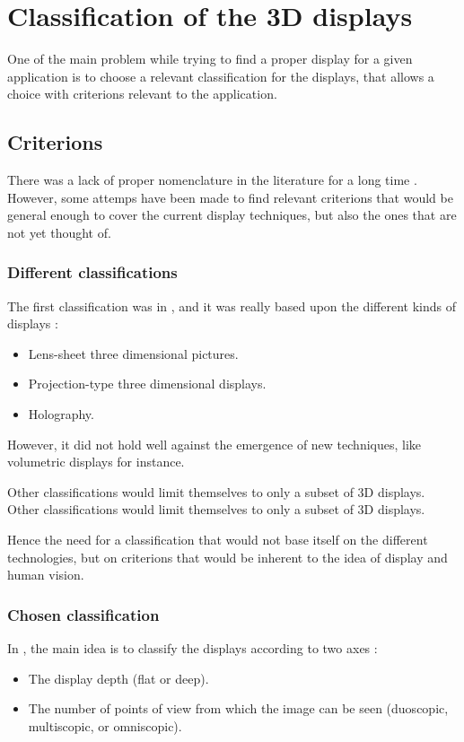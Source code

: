 \section{Classification of the 3D displays}
One of the main problem while trying to find a proper \gls{display} for a given application is to choose a relevant classification for the displays, that allows a choice with criterions relevant to the application.
\subsection{Criterions}
There was a lack of proper nomenclature in the literature for a long time \cite{pimenta2012comprehensive}. However, some attemps have been made to find relevant criterions that would be general enough to cover the current display techniques, but also the ones that are not yet thought of.

\subsubsection{Different classifications}
The first classification was in \cite{okoshi1976three}, and it was really based upon the different kinds of displays : 
\begin{itemize}
\item Lens-sheet three dimensional pictures.
\item Projection-type three dimensional displays.
\item Holography.
\end{itemize}

However, it did not hold well against the emergence of new techniques, like volumetric displays for instance.

Other classifications %
would limit themselves to only a subset of 3D displays.
Other classifications \cite{refnécessaire} would limit themselves to only a subset of 3D displays.


Hence the need for a classification that would not base itself on the different technologies, but on criterions that would be inherent to the idea of display and human vision.

\subsubsection{Chosen classification}
In \cite{pimenta2012comprehensive}, the main idea is to classify the displays according to two axes : 

\begin{itemize}
\item The display depth (flat or deep).
\item The number of points of view from which the image can be seen (duoscopic, multiscopic, or omniscopic).
\end{itemize}

